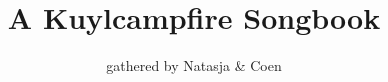\documentclass[11pt,a4,openany]{article}
\title{A Kuylcampfire Songbook}
\author{gathered by Natasja \& Coen}
\begin{document}

\maketitle




\begin{songs}{} %

	\onecolumn

	
	
	
	
	
	
	
	
	
	
	
	
	
	
	
	
	
	
	
	


%			
\end{songs}




\end{document}
